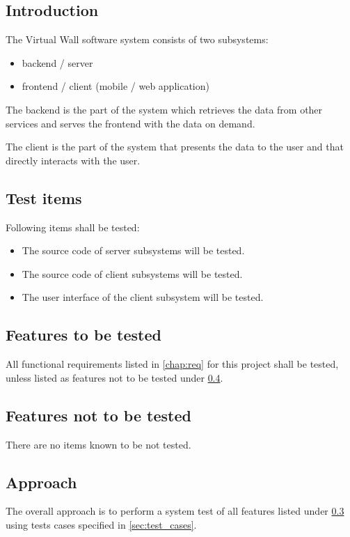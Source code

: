 \documentclass[11pt]{book}
\begin{document}
\subsection{Introduction}
The Virtual Wall software system consists of two subsystems:

\begin{itemize}
    \item backend / server
    \item frontend / client (mobile / web application)
\end{itemize}

The backend is the part of the system which retrieves the data from other services and serves the frontend with the data on demand.

The client is the part of the system that presents the data to the user and that directly interacts with the user.

\subsection{Test items}
Following items shall be tested:

\begin{itemize}
    \item The source code of server subsystems will be tested.
    \item The source code of client subsystems will be tested.
    \item The user interface of the client subsystem will be tested.
\end{itemize}

\subsection{Features to be tested} \label{sec:test_plan_features_tested}
All functional requirements listed in \ref{chap:req} for this project shall be tested, unless listed as features not to be tested under \ref{sec:test_plan_features_not_tested}.

\subsection{Features not to be tested} \label{sec:test_plan_features_not_tested}
There are no items known to be not tested.

\subsection{Approach}
The overall approach is to perform a system test of all features listed under \ref{sec:test_plan_features_tested} using tests cases specified in \ref{sec:test_cases}.
\end{document}
